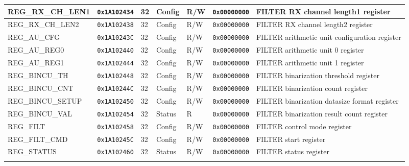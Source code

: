 {\begin{tabularx}{\textwidth}{|l|l|l|l|l|l|X|}
  \hline
  REG\_RX\_CH\_LEN1 & \texttt{0x1A102434} & 32 & Config & R/W & \texttt{0x00000000} & FILTER RX channel length1 register\\
  \hline
  REG\_RX\_CH\_LEN2 & \texttt{0x1A102438} & 32 & Config & R/W & \texttt{0x00000000} & FILTER RX channel length2 register\\
  \hline
  REG\_AU\_CFG & \texttt{0x1A10243C} & 32 & Config & R/W & \texttt{0x00000000} & FILTER arithmetic unit configuration register\\
  \hline
  REG\_AU\_REG0 & \texttt{0x1A102440} & 32 & Config & R/W & \texttt{0x00000000} & FILTER arithmetic unit 0 register\\
  \hline
  REG\_AU\_REG1 & \texttt{0x1A102444} & 32 & Config & R/W & \texttt{0x00000000} & FILTER arithmetic unit 1 register\\
  \hline
  REG\_BINCU\_TH & \texttt{0x1A102448} & 32 & Config & R/W & \texttt{0x00000000} & FILTER binarization threshold register\\
  \hline
  REG\_BINCU\_CNT & \texttt{0x1A10244C} & 32 & Config & R/W & \texttt{0x00000000} & FILTER binarization count register\\
  \hline
  REG\_BINCU\_SETUP & \texttt{0x1A102450} & 32 & Config & R/W & \texttt{0x00000000} & FILTER binarization datasize format register\\
  \hline
  REG\_BINCU\_VAL & \texttt{0x1A102454} & 32 & Status & R & \texttt{0x00000000} & FILTER binarization result count register\\
  \hline
  REG\_FILT & \texttt{0x1A102458} & 32 & Config & R/W & \texttt{0x00000000} & FILTER control mode register\\
  \hline
  REG\_FILT\_CMD & \texttt{0x1A10245C} & 32 & Config & R/W & \texttt{0x00000000} & FILTER start register\\
  \hline
  REG\_STATUS & \texttt{0x1A102460} & 32 & Status & R/W & \texttt{0x00000000} & FILTER status register\\
  \hline
  \caption{uDMA Filter}
\end{tabularx}
}


